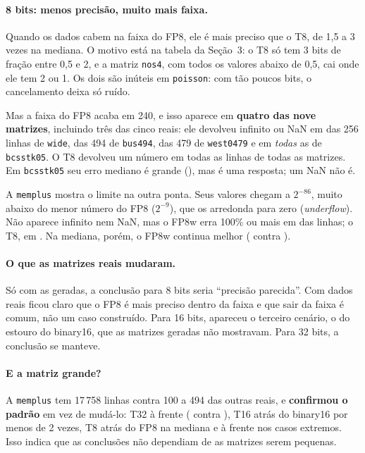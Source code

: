 \documentclass[11pt,a4paper]{article}
\newcommand{\code}[1]{\texttt{#1}}
\begin{document}
\paragraph{8 bits: menos precisão, muito mais faixa.} Quando os dados cabem na faixa do FP8, ele é mais
preciso que o T8, de 1,5 a 3 vezes na mediana. O motivo está na tabela da Seção~3: o T8 só tem 3 bits de
fração entre 0,5 e 2, e a matriz \code{nos4}, com todos os valores abaixo de 0,5, cai onde ele tem 2 ou 1.
Os dois são inúteis em \code{poisson}: com tão poucos bits, o cancelamento deixa só ruído.

Mas a faixa do FP8 acaba em 240, e isso aparece em \textbf{quatro das nove matrizes}, incluindo três das
cinco reais: ele devolveu infinito ou NaN em \FPEIGHTBAD{} das 256 linhas de \code{wide}, \NFBUS{} das
494 de \code{bus494}, \NFWEST{} das 479 de \code{west0479} e em \emph{todas} as \NFBCS{} de
\code{bcsstk05}. O T8 devolveu um número em todas as linhas de todas as matrizes. Em \code{bcsstk05} seu
erro mediano é grande (\BCSTEIGHT), mas é uma resposta; um NaN não é.

A \code{memplus} mostra o limite na outra ponta. Seus valores chegam a $2^{-86}$, muito abaixo do menor
número do FP8 ($2^{-9}$), que os arredonda para zero (\emph{underflow}). Não aparece infinito nem NaN, mas
o FP8w erra 100\% ou mais em \MEMFEBAD{} das \MEMROWS{} linhas; o T8, em \MEMTEBAD. Na mediana, porém, o
FP8w continua melhor (\MEMFE{} contra \MEMTE).

\paragraph{O que as matrizes reais mudaram.} Só com as geradas, a conclusão para 8 bits seria ``precisão
parecida''. Com dados reais ficou claro que o FP8 é mais preciso dentro da faixa e que sair da faixa é
comum, não um caso construído. Para 16 bits, apareceu o terceiro cenário, o do estouro do binary16, que as
matrizes geradas não mostravam. Para 32 bits, a conclusão se manteve.

\paragraph{E a matriz grande?} A \code{memplus} tem 17\,758 linhas contra 100 a 494 das outras reais, e
\textbf{confirmou o padrão} em vez de mudá-lo: T32 à frente (\MEMTT{} contra \MEMFT), T16 atrás do
binary16 por menos de 2 vezes, T8 atrás do FP8 na mediana e à frente nos casos extremos. Isso indica que
as conclusões não dependiam de as matrizes serem pequenas.
\end{document}
